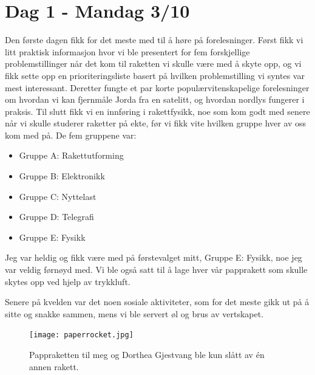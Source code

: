 \documentclass[norsk,a4paper,12pt]{article}
\begin{document}
\section*{Dag 1 - Mandag 3/10}
Den f{\o}rste dagen fikk for det meste med til {\aa} h{\o}re p{\aa} forelesninger. F{\o}rst fikk vi litt praktisk informasjon hvor vi ble presentert for fem forskjellige problemstillinger n{\aa}r det kom til raketten vi skulle v{\ae}re med {\aa} skyte opp, og vi fikk sette opp en prioriteringsliste basert p{\aa} hvilken problemstilling vi syntes var mest interessant. Deretter fungte et par korte popul{\ae}rvitenskapelige forelesninger om hvordan vi kan fjernm{\aa}le Jorda fra en satelitt, og hvordan nordlys fungerer i praksis. Til slutt fikk vi en innf{\o}ring i rakettfysikk, noe som kom godt med senere n{\aa}r vi skulle studerer raketter p{\aa} ekte, f{\o}r vi fikk vite hvilken gruppe hver av oss kom med p{\aa}. De fem gruppene var:
\begin{itemize}
\item Gruppe A: Rakettutforming
\item Gruppe B: Elektronikk
\item Gruppe C: Nyttelast
\item Gruppe D: Telegrafi
\item Gruppe E: Fysikk
\end{itemize}
Jeg var heldig og fikk v{\ae}re med p{\aa} f{\o}rstevalget mitt, Gruppe E: Fysikk, noe jeg var veldig f{\o}rn{\o}yd med. Vi ble ogs{\aa} satt til {\aa} lage hver v{\aa}r papprakett som skulle skytes opp ved hjelp av trykkluft.\par\vspace{3mm} Senere p{\aa} kvelden var det noen sosiale aktiviteter, som for det meste gikk ut p{\aa} {\aa} sitte og snakke sammen, mens vi ble servert {\o}l og brus av vertskapet.

\begin{figure}[H]
\centering
\texttt{[image: paperrocket.jpg]}
\caption{Pappraketten til meg og Dorthea Gjestvang ble kun sl{\aa}tt av {\'e}n annen rakett. \label{overflow}}
\end{figure}
\end{document}
